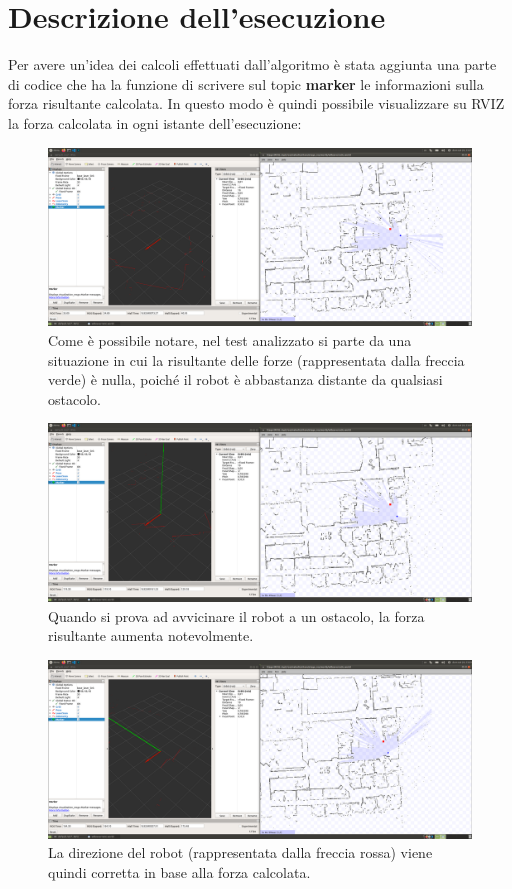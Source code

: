 \documentclass[Lau, binding=0.6cm, oneside]{sapthesis}
\begin{document}
\section{Descrizione dell'esecuzione}
Per avere un'idea dei calcoli effettuati dall'algoritmo è stata aggiunta una parte di codice che ha la funzione di scrivere sul topic \textbf{marker} le informazioni sulla forza risultante calcolata.
In questo modo è quindi possibile visualizzare su RVIZ la forza calcolata in ogni istante dell'esecuzione:
\begin{figure}[htp]
    \centering
    \includegraphics[width=13.5cm]{rviz_force1.png}
    \caption{Come è possibile notare, nel test analizzato si parte da una situazione in cui la risultante delle forze (rappresentata dalla freccia verde) è nulla, poiché il robot è abbastanza distante da qualsiasi ostacolo.}
    \label{fig:rviz_force1}
\end{figure}
\begin{figure}[htp]
    \centering
    \includegraphics[width=13.5cm]{rviz_force2.png}
    \caption{Quando si prova ad avvicinare il robot a un ostacolo, la forza risultante aumenta notevolmente.}
    \label{fig:rviz_force2}
\end{figure}
\begin{figure}[htp]
    \centering
    \includegraphics[width=13.5cm]{rviz_force3.png}
    \caption{La direzione del robot (rappresentata dalla freccia rossa) viene quindi corretta in base alla forza calcolata.}
    \label{fig:rviz_force3}
\end{figure}
\end{document}
